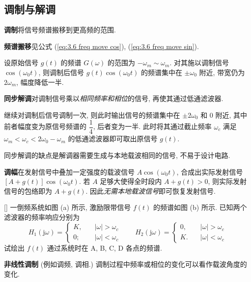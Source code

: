 \subsection{调制与解调} \label{5 调制与解调}
\textbf{调制}\quad 将信号频谱搬移到更高频的范围.

\textbf{频谱搬移}\quad 见公式 (\ref{eq:3.6 freq move cos}), (\ref{eq:3.6 freq move sin}).

设原始信号 $g(t)$ 的频谱 $G(\omega)$ 的范围为 $-\omega_m\sim\omega_m$. 对其施以调制信号 $\cos(\omega_0 t)$, 则调制后信号 $g(t)\cos(\omega_0 t)$ 的频谱集中在 $\pm\omega_0$ 附近, 带宽仍为 $2\omega_m$, 幅度降低一半.

\textbf{同步解调}\quad 对调制信号乘以\textit{相同频率和相位}的信号, 再使其通过低通滤波器.

继续对调制后信号调制一次, 则此时输出信号的频谱集中在 $\pm 2\omega_0$ 和 $0$ 附近, 其中前者幅度变为原信号频谱的 $\dfrac{1}{4}$, 后者变为一半. 此时将其通过截止频率 $\omega_c$ 满足 $\omega_m<\omega_c<2\omega_0-\omega_m$ 的低通滤波器即可取出原信号 $g(t)$.

同步解调的缺点是解调器需要生成与本地载波相同的信号, 不易于设计电路.

\textbf{调幅}\quad 在发射信号中叠加一定强度的载波信号 $A\cos(\omega_0 t)$, 合成出实际发射信号 $[A+g(t)]\cos(\omega_0 t)$. 若 $A$ 足够大使得全时段内 $A+g(t)>0$, 则实际发射信号的包络即为 $A+g(t)$. 因此\textit{无需本地载波信号}即可恢复发射信号.

\begin{exampleprob} \ref{}
    一倒频系统如图 (a) 所示, 激励限带信号 $f(t)$ 的频谱如图 (b) 所示. 已知两个滤波器的频率响应分别为
    \begin{equation*}
        H_1(\mathrm{j}\omega)=\begin{cases}
            K, & \quad |\omega|>\omega_c \\
            0; & \quad |\omega|<\omega_c
        \end{cases} \qquad
        H_2(\mathrm{j}\omega)=\begin{cases}
            0, & \quad |\omega|>\omega_c \\
            K. & \quad |\omega|<\omega_c
        \end{cases}
    \end{equation*}
    试绘出 $f(t)$ 通过系统时在 A, B, C, D 各点的频谱.

    \begin{solution}

    \end{solution}
\end{exampleprob}

\textbf{非线性调制} (例如调频, 调相.) 调制过程中频率或相位的变化可以看作载波角度的变化.
